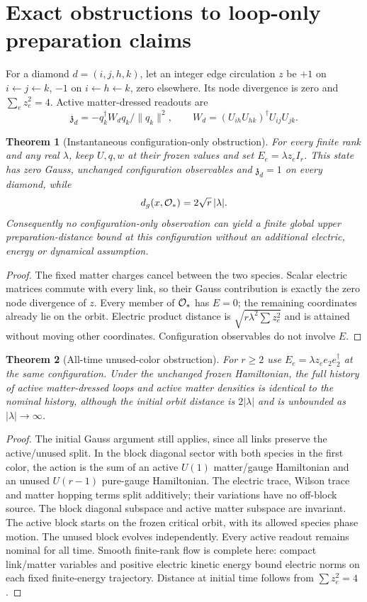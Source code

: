 \documentclass[11pt,a4paper]{article}
\newtheorem{theorem}{Theorem}\newtheorem{lemma}[theorem]{Lemma}\newtheorem{corollary}[theorem]{Corollary}
\begin{document}
\section{Exact obstructions to loop-only preparation claims}
For a diamond $d=(i,j,h,k)$, let an integer edge circulation $z$ be $+1$ on $i\leftarrow j\leftarrow k$, $-1$ on $i\leftarrow h\leftarrow k$, zero elsewhere. Its node divergence is zero and $\sum_e z_e^2=4$. Active matter-dressed readouts are
\[
\mathfrak z_d=-q_k^\dagger W_dq_k/\|q_k\|^2,\qquad
W_d=(U_{ih}U_{hk})^\dagger U_{ij}U_{jk}.
\]
\begin{theorem}[Instantaneous configuration-only obstruction]
For every finite rank and any real $\lambda$, keep $U,q,w$ at their frozen values and set $E_e=\lambda z_e I_r$. This state has zero Gauss, unchanged configuration observables and $\mathfrak z_d=1$ on every diamond, while
\[
d_g(x,\mathcal O_*)=2\sqrt r\,|\lambda|.
\]
Consequently no configuration-only observation can yield a finite global upper preparation-distance bound at this configuration without an additional electric, energy or dynamical assumption.
\end{theorem}
\begin{proof}
The fixed matter charges cancel between the two species. Scalar electric matrices commute with every link, so their Gauss contribution is exactly the zero node divergence of $z$. Every member of $\mathcal O_*$ has $E=0$; the remaining coordinates already lie on the orbit. Electric product distance is $\sqrt{r\lambda^2\sum z_e^2}$ and is attained without moving other coordinates. Configuration observables do not involve $E$.
\end{proof}
\begin{theorem}[All-time unused-color obstruction]
For $r\ge2$ use $E_e=\lambda z_e e_2e_2^\dagger$ at the same configuration. Under the unchanged frozen Hamiltonian, the full history of active matter-dressed loops and active matter densities is identical to the nominal history, although the initial orbit distance is $2|\lambda|$ and is unbounded as $|\lambda|\to\infty$.
\end{theorem}
\begin{proof}
The initial Gauss argument still applies, since all links preserve the active/unused split. In the block diagonal sector with both species in the first color, the action is the sum of an active $U(1)$ matter/gauge Hamiltonian and an unused $U(r-1)$ pure-gauge Hamiltonian. The electric trace, Wilson trace and matter hopping terms split additively; their variations have no off-block source. The block diagonal subspace and active matter subspace are invariant. The active block starts on the frozen critical orbit, with its allowed species phase motion. The unused block evolves independently. Every active readout remains nominal for all time. Smooth finite-rank flow is complete here: compact link/matter variables and positive electric kinetic energy bound electric norms on each fixed finite-energy trajectory. Distance at initial time follows from $\sum z_e^2=4$.
\end{proof}
\end{document}
